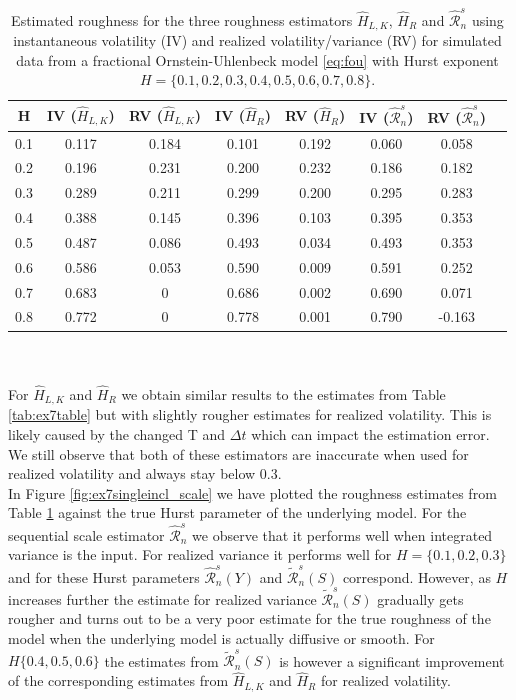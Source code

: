 \documentclass{article}
\begin{document}
\begin{table}[htbp]
    \centering
    \begin{tabular}{cccccccc}
        \toprule
        H & IV ($\widehat{H}_{L,K}$) & RV ($\widehat{H}_{L,K}$) & IV ($\widehat{H}_{R}$) & RV ($\widehat{H}_{R}$) & IV ($\widehat{\mathscr{R}}_n^s$) & RV ($\widehat{\mathscr{R}}_n^s$)\\
        \midrule
        0.1 & 0.117 & 0.184 & 0.101 & 0.192 & 0.060 & 0.058\\
        0.2 & 0.196 & 0.231 & 0.200 & 0.232 & 0.186 & 0.182\\
        0.3 & 0.289 & 0.211 & 0.299 & 0.200 & 0.295 & 0.283\\
        0.4 & 0.388 & 0.145 & 0.396 & 0.103 & 0.395 & 0.353\\
        0.5 & 0.487 & 0.086 & 0.493 & 0.034 & 0.493 & 0.353\\
        0.6 & 0.586 & 0.053 & 0.590 & 0.009 & 0.591 & 0.252\\
        0.7 & 0.683 & 0 & 0.686 & 0.002 & 0.690 & 0.071\\
        0.8 & 0.772 & 0 & 0.778 & 0.001 & 0.790 & -0.163\\
        \bottomrule
    \end{tabular}
    \caption{Estimated roughness for the three roughness estimators $\widehat{H}_{L,K}$, $\widehat{H}_R$ and $\widehat{\mathscr{R}}_n^s$ using instantaneous volatility (IV) and realized volatility/variance (RV) for simulated data from a fractional Ornstein-Uhlenbeck model \eqref{eq:fou} with Hurst exponent $H=\{0.1,0.2,0.3,0.4,0.5,0.6,0.7,0.8\}$.}
    \label{tab:ex7tableincl_scale}
\end{table}\\\\
For $\widehat{H}_{L,K}$ and $\widehat{H}_{R}$ we obtain similar results to the estimates from Table \ref{tab:ex7table} but with slightly rougher estimates for realized volatility. This is likely caused by the changed T and $\Delta t$ which can impact the estimation error. We still observe that both of these estimators are inaccurate when used for realized volatility and always stay below 0.3.\\
In Figure \ref{fig:ex7singleincl_scale} we have plotted the roughness estimates from Table \ref{tab:ex7tableincl_scale}  against the true Hurst parameter of the underlying model. For the sequential scale estimator $\widehat{\mathscr{R}}_n^s$ we observe that it performs well when integrated variance is the input. For realized variance it performs well for $H=\{0.1,0.2,0.3\}$ and for these Hurst parameters $\widehat{\mathscr{R}}_n^s (Y)$ and $\widetilde{\mathscr{R}}_n^s (S)$ correspond. However, as $H$ increases further the estimate for realized variance $\widetilde{\mathscr{R}}_n^s (S)$ gradually gets rougher and turns out to be a very poor estimate for the true roughness of the model when the underlying model is actually diffusive or smooth. For $H\{0.4,0.5,0.6\}$ the estimates from $\widetilde{\mathscr{R}}_n^s (S)$ is however a significant improvement of the corresponding estimates from $\widehat{H}_{L,K}$ and $\widehat{H}_{R}$ for realized volatility.
\end{document}
